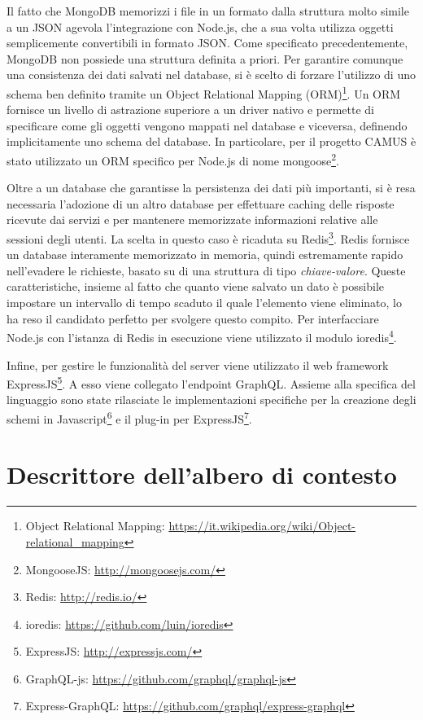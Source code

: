 Il fatto che MongoDB memorizzi i file in un formato dalla struttura molto simile a un JSON agevola l'integrazione con Node.js, che a sua volta utilizza oggetti semplicemente convertibili in formato JSON. Come specificato precedentemente, MongoDB non possiede una struttura definita a priori. Per garantire comunque una consistenza dei dati salvati nel database, si è scelto di forzare l'utilizzo di uno schema ben definito tramite un Object Relational Mapping (ORM)\footnote{Object Relational Mapping: \url{https://it.wikipedia.org/wiki/Object-relational_mapping}}. Un ORM fornisce un livello di astrazione superiore a un driver nativo e permette di specificare come gli oggetti vengono mappati nel database e viceversa, definendo implicitamente uno schema del database. In particolare, per il progetto CAMUS è stato utilizzato un ORM specifico per Node.js di nome mongoose\footnote{MongooseJS: \url{http://mongoosejs.com/}}.

Oltre a un database che garantisse la persistenza dei dati più importanti, si è resa necessaria l'adozione di un altro database per effettuare  caching delle risposte ricevute dai servizi e per mantenere memorizzate informazioni relative alle sessioni degli utenti. La scelta in questo caso è ricaduta su Redis\footnote{Redis: \url{http://redis.io/}}. Redis fornisce un database interamente memorizzato in memoria, quindi estremamente rapido nell'evadere le richieste, basato su di una struttura di tipo \emph{chiave-valore}. Queste caratteristiche, insieme al fatto che quanto viene salvato un dato è possibile impostare un intervallo di tempo scaduto il quale l'elemento viene eliminato, lo ha reso il candidato perfetto per svolgere questo compito. Per interfacciare Node.js con l'istanza di Redis in esecuzione viene utilizzato il modulo ioredis\footnote{ioredis: \url{https://github.com/luin/ioredis}}.

Infine, per gestire le funzionalità del server viene utilizzato il web framework ExpressJS\footnote{ExpressJS: \url{http://expressjs.com/}}. A esso viene collegato l'endpoint GraphQL. Assieme alla specifica del linguaggio sono state rilasciate le implementazioni specifiche per la creazione degli schemi in Javascript\footnote{GraphQL-js: \url{https://github.com/graphql/graphql-js}} e il plug-in per ExpressJS\footnote{Express-GraphQL: \url{https://github.com/graphql/express-graphql}}.

\section{Descrittore dell'albero di contesto\label{sec:descrittore-albero-contesto}}

